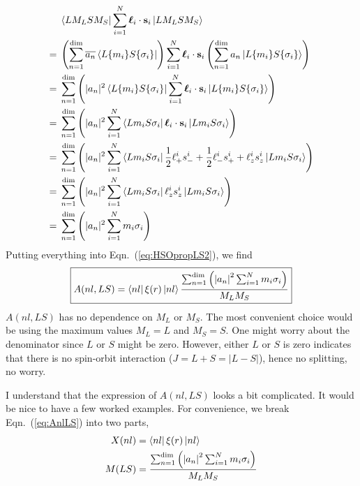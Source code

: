 \begin{align} \label{eq:mssum}
{} & \Bra{LM_LSM_S} \sum_{i=1}^N \boldsymbol{\ell}_i\cdot\mathbf{s}_i \Ket{LM_LSM_S} \nonumber \\
= {} & \left(\sum_{n=1}^\text{dim} \overline{a_n} \Bra{L\{m_i\}S\{\sigma_i\}}\right) \sum_{i=1}^N \boldsymbol{\ell}_i\cdot\mathbf{s}_i \left(\sum_{n=1}^\text{dim} a_n \Ket{L\{m_i\}S\{\sigma_i\}}\right) \nonumber \\
= {} & \sum_{n=1}^\text{dim} \left( |a_n|^2 \Bra{L\{m_i\}S\{\sigma_i\}} \sum_{i=1}^N \boldsymbol{\ell}_i\cdot\mathbf{s}_i \Ket{L\{m_i\}S\{\sigma_i\}} \right) \nonumber \\
= {} & \sum_{n=1}^\text{dim} \left( |a_n|^2 \sum_{i=1}^N \Bra{Lm_iS\sigma_i} \boldsymbol{\ell}_i\cdot\mathbf{s}_i \Ket{Lm_iS\sigma_i} \right) \nonumber \\
= {} & \sum_{n=1}^\text{dim} \left( |a_n|^2 \sum_{i=1}^N \Bra{Lm_iS\sigma_i} \frac{1}{2}\ell_+^is_-^i + \frac{1}{2}\ell_-^is_+^i + \ell_z^is_z^i \Ket{Lm_iS\sigma_i} \right) \nonumber \\
= {} & \sum_{n=1}^\text{dim} \left( |a_n|^2 \sum_{i=1}^N \Bra{Lm_iS\sigma_i} \ell_z^is_z^i \Ket{Lm_iS\sigma_i} \right) \nonumber \\
= {} & \sum_{n=1}^\text{dim} \left( |a_n|^2 \sum_{i=1}^N m_i \sigma_i \right)
\end{align}
%
Putting everything into Eqn.~(\ref{eq:HSOpropLS2}), we find
\begin{equation} \label{eq:AnlLS}
\boxed{
A(nl,LS) = \Bra{nl}\xi(r)\Ket{nl} \frac{\sum_{n=1}^\text{dim}\left( \left|a_n\right|^2 \sum_{i=1}^N m_i \sigma_i \right)}{M_LM_S}
}
\end{equation}
%
$A(nl,LS)$ has no dependence on $M_L$ or $M_S$. The most convenient choice would be
using the maximum values $M_L=L$ and $M_S=S$. One might worry about the denominator
since $L$ or $S$ might be zero. However, either $L$ or $S$ is zero indicates that
there is no spin-orbit interaction ($J=L+S=|L-S|$), hence no splitting, no worry.

I understand that the expression of $A(nl,LS)$ looks a bit complicated.
It would be nice to have a few worked examples. For convenience,
we break Eqn.~(\ref{eq:AnlLS}) into two parts,
\begin{align}
X(nl) & = \Bra{nl}\xi(r)\Ket{nl} \\
M(LS) & = \frac{\sum_{n=1}^\text{dim}\left( \left|a_n\right|^2 \sum_{i=1}^N m_i \sigma_i \right)}{M_LM_S}
\end{align}

